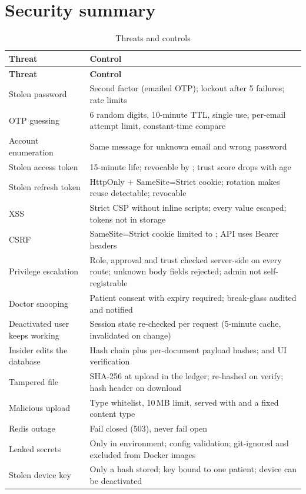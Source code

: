 \section{Security summary}

\begin{longtable}{@{}P{4.4cm}P{9.6cm}@{}}
\caption{Threats and controls}\label{tab:threats}\\
\toprule
\textbf{Threat} & \textbf{Control} \\
\midrule
\endfirsthead
\toprule
\textbf{Threat} & \textbf{Control} \\
\midrule
\endhead
Stolen password & Second factor (emailed OTP); lockout after 5 failures; rate limits \\
OTP guessing & 6 random digits, 10-minute TTL, single use, per-email attempt limit, constant-time compare \\
Account enumeration & Same message for unknown email and wrong password \\
Stolen access token & 15-minute life; revocable by ; trust score drops with age \\
Stolen refresh token & HttpOnly + SameSite=Strict cookie; rotation makes reuse detectable; revocable \\
XSS & Strict CSP without inline scripts; every value escaped; tokens not in storage \\
CSRF & SameSite=Strict cookie limited to ; API uses Bearer headers \\
Privilege escalation & Role, approval and trust checked server-side on every route; unknown body fields rejected; admin not self-registrable \\
Doctor snooping & Patient consent with expiry required; break-glass audited and notified \\
Deactivated user keeps working & Session state re-checked per request (5-minute cache, invalidated on change) \\
Insider edits the database & Hash chain plus per-document payload hashes;  and UI verification \\
Tampered file & SHA-256 at upload in the ledger; re-hashed on verify; hash header on download \\
Malicious upload & Type whitelist, 10\,MB limit, served with  and a fixed content type \\
Redis outage & Fail closed (503), never fail open \\
Leaked secrets & Only in environment; config validation;  git-ignored and excluded from Docker images \\
Stolen device key & Only a hash stored; key bound to one patient; device can be deactivated \\
\bottomrule
\end{longtable}

